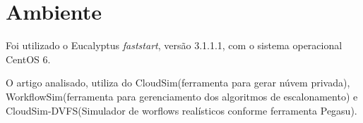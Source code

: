 \section{Ambiente}

Foi utilizado o Eucalyptus \textit{faststart}, versão 3.1.1.1, com o sistema operacional CentOS 6.

O artigo analisado, utiliza do CloudSim(ferramenta para gerar núvem privada), WorkflowSim(ferramenta para gerenciamento dos algoritmos de escalonamento) e CloudSim-DVFS(Simulador de worflows realísticos conforme ferramenta Pegasu).
